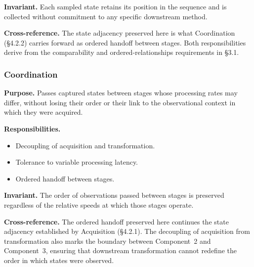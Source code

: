   \textbf{Invariant.} Each sampled state retains its position in the sequence and is collected without commitment to any specific downstream method.

  \textbf{Cross-reference.} The state adjacency preserved here is what Coordination (\S4.2.2) carries forward as ordered handoff between stages. Both responsibilities derive from the comparability and ordered-relationships requirements in \S3.1.

  \subsubsection{Coordination}
  \textbf{Purpose.} Passes captured states between stages whose processing rates may differ, without losing their order or their link to the observational context in which they were acquired.

  \textbf{Responsibilities.}
  \begin{itemize}
    \item Decoupling of acquisition and transformation.
    \item Tolerance to variable processing latency.
    \item Ordered handoff between stages.
  \end{itemize}

  \textbf{Invariant.} The order of observations passed between stages is preserved regardless of the relative speeds at which those stages operate.

  \textbf{Cross-reference.} The ordered handoff preserved here continues the state adjacency established by Acquisition (\S4.2.1). The decoupling of acquisition from transformation also marks the boundary between Component~2 and Component~3, ensuring that downstream transformation cannot redefine the order in which states were observed.

